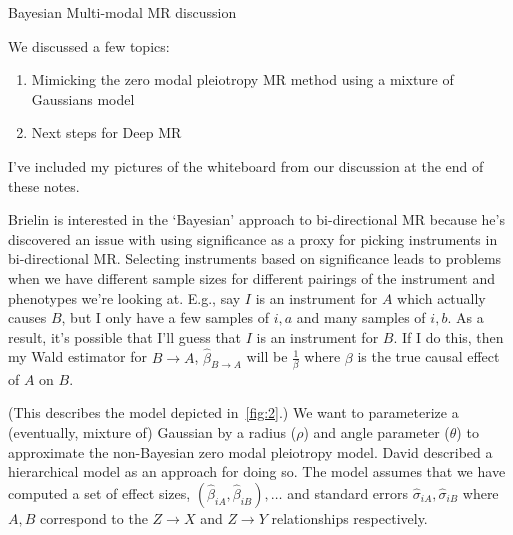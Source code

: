 \begin{Minutes}{Bayesian Multi-modal MR discussion}
\maketitle
{}
We discussed a few topics:
\begin{enumerate}
    \item Mimicking the zero modal pleiotropy MR method using a mixture of Gaussians model
    \item Next steps for Deep MR
\end{enumerate}

I've included my pictures of the whiteboard from our discussion at the end of
these notes.

Brielin is interested in the `Bayesian' approach to bi-directional MR because
he's discovered an issue with using significance as a proxy for picking instruments
in bi-directional MR. Selecting instruments based on significance leads to problems
when we have different sample sizes for different pairings of the instrument and
phenotypes we're looking at. E.g., say \( I \) is an instrument for \( A \) which
actually causes \( B \), but I only have a few samples of \( i, a \) and many
samples of \( i, b \). As a result, it's possible that I'll guess that
\( I \) is an instrument for \( B \). If I do this, then my Wald estimator
for \( B \rightarrow A \), \( \hat{\beta}_{B \rightarrow A} \) will be
\( \frac{1}{\beta} \) where \( \beta \) is the true causal effect of
\( A \) on \( B \).

(This describes the model depicted in~\ref{fig:2}.)
We want to parameterize a (eventually, mixture of) Gaussian by a radius (\( \rho \))
and angle parameter (\( \theta \)) to approximate the non-Bayesian zero modal
pleiotropy model. David described a hierarchical model as an approach
for doing so. The model assumes that we have computed a set of effect sizes,
\( (\hat{\beta}_{iA}, \hat{\beta}_{iB}), \dots \) and standard errors
\( \hat{\sigma}_{iA}, \hat{\sigma}_{iB} \) where \( A, B \) correspond to the
\( Z \rightarrow X \) and \( Z \rightarrow Y \) relationships respectively.


\end{Minutes}
